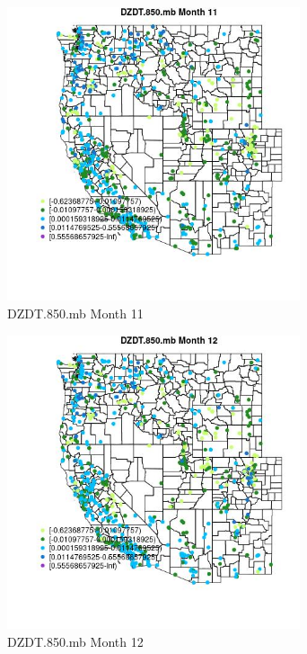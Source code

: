 \begin{figure} 
\centering  
\includegraphics[width=0.77\textwidth]{Code_Outputs/Report_ML_input_PM25_Step4_part_f_de_duplicated_aves_prioritize_24hr_obswNAs_MapObsMo11DZDT850mb.jpg} 
\caption{\label{fig:Report_ML_input_PM25_Step4_part_f_de_duplicated_aves_prioritize_24hr_obswNAsMapObsMo11DZDT850mb}DZDT.850.mb Month 11} 
\end{figure} 
 

\begin{figure} 
\centering  
\includegraphics[width=0.77\textwidth]{Code_Outputs/Report_ML_input_PM25_Step4_part_f_de_duplicated_aves_prioritize_24hr_obswNAs_MapObsMo12DZDT850mb.jpg} 
\caption{\label{fig:Report_ML_input_PM25_Step4_part_f_de_duplicated_aves_prioritize_24hr_obswNAsMapObsMo12DZDT850mb}DZDT.850.mb Month 12} 
\end{figure} 
 

